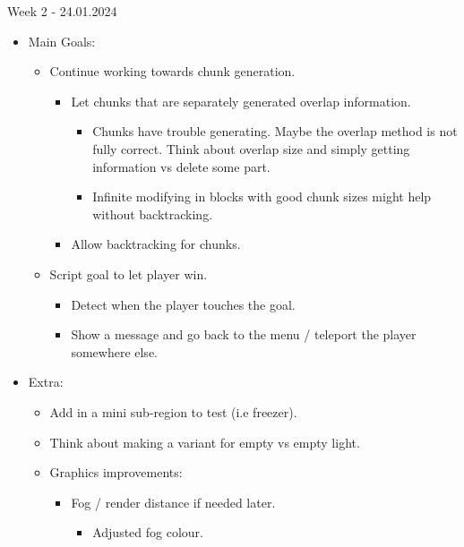 \noindent Week 2 - 24.01.2024
\begin{itemize}
    \item Main Goals:
          \begin{itemize}
              \item Continue working towards chunk generation.
                    \begin{itemize}
                        \item Let chunks that are separately generated overlap information.
                              \begin{itemize}
                                  \item Chunks have trouble generating. Maybe the overlap method is not fully correct. Think about overlap size and simply getting information vs delete some part.
                                  \item Infinite modifying in blocks with good chunk sizes might help without backtracking.
                              \end{itemize}
                        \item Allow backtracking for chunks.
                    \end{itemize}
              \item Script goal to let player win.
                    \begin{itemize}
                        \item Detect when the player touches the goal.
                        \item Show a message and go back to the menu / teleport the player somewhere else.
                    \end{itemize}
          \end{itemize}
    \item Extra:
          \begin{itemize}
              \item Add in a mini sub-region to test (i.e freezer).
              \item Think about making a variant for empty vs empty light.
              \item Graphics improvements:
                    \begin{itemize}
                        \item Fog / render distance if needed later.
                              \begin{itemize}
                                  \item Adjusted fog colour.

\end{itemize}
\end{itemize}
\end{itemize}
\end{itemize}
